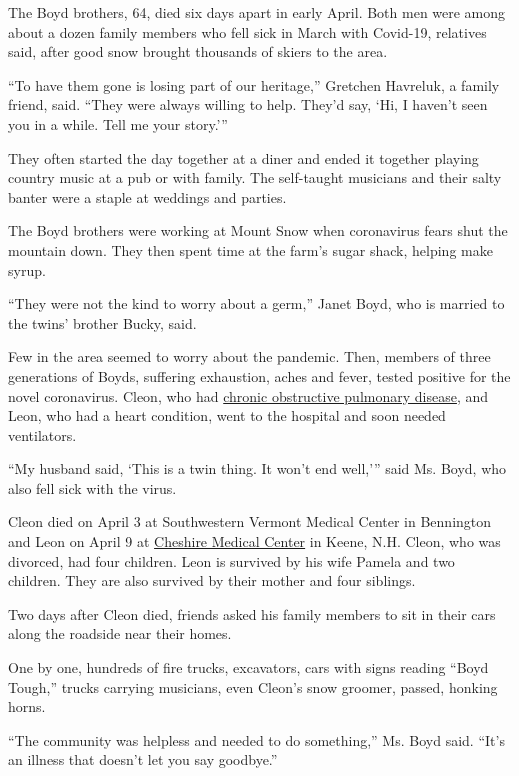 The Boyd brothers, 64, died six days apart in early April. Both men were
among about a dozen family members who fell sick in March with Covid-19,
relatives said, after good snow brought thousands of skiers to the area.

``To have them gone is losing part of our heritage,'' Gretchen Havreluk,
a family friend, said. ``They were always willing to help. They'd say,
`Hi, I haven't seen you in a while. Tell me your story.'''

They often started the day together at a diner and ended it together
playing country music at a pub or with family. The self-taught musicians
and their salty banter were a staple at weddings and parties.

The Boyd brothers were working at Mount Snow when coronavirus fears shut
the mountain down. They then spent time at the farm's sugar shack,
helping make syrup.

``They were not the kind to worry about a germ,'' Janet Boyd, who is
married to the twins' brother Bucky, said.

Few in the area seemed to worry about the pandemic. Then, members of
three generations of Boyds, suffering exhaustion, aches and fever,
tested positive for the novel coronavirus. Cleon, who had
\href{https://www.mayoclinic.org/diseases-conditions/copd/symptoms-causes/syc-20353679}{chronic
obstructive pulmonary disease}, and Leon, who had a heart condition,
went to the hospital and soon needed ventilators.

``My husband said, `This is a twin thing. It won't end well,''' said Ms.
Boyd, who also fell sick with the virus.

Cleon died on April 3 at Southwestern Vermont Medical Center in
Bennington and Leon on April 9 at
\href{https://www.cheshire-med.com/}{Cheshire Medical Center} in Keene,
N.H. Cleon, who was divorced, had four children. Leon is survived by his
wife Pamela and two children. They are also survived by their mother and
four siblings.

Two days after Cleon died, friends asked his family members to sit in
their cars along the roadside near their homes.

One by one, hundreds of fire trucks, excavators, cars with signs reading
``Boyd Tough,'' trucks carrying musicians, even Cleon's snow groomer,
passed, honking horns.

``The community was helpless and needed to do something,'' Ms. Boyd
said. ``It's an illness that doesn't let you say goodbye.''

